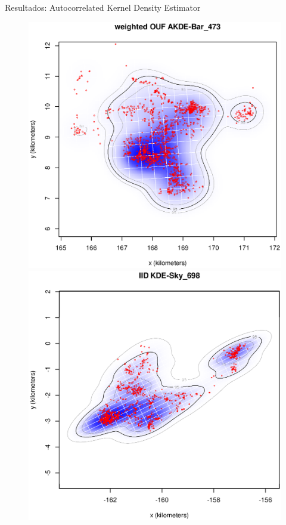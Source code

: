 \documentclass[11pt]{beamer}
\begin{document}
\begin{frame}{Resultados: Autocorrelated Kernel Density Estimator}
\begin{figure}
            \includegraphics[scale=0.2]{images/w_ouf_kde_Bar_473}\\
            \includegraphics[scale=0.2]{images/iid_kde_Sky_698}

\end{figure}
\end{frame}
\end{document}
